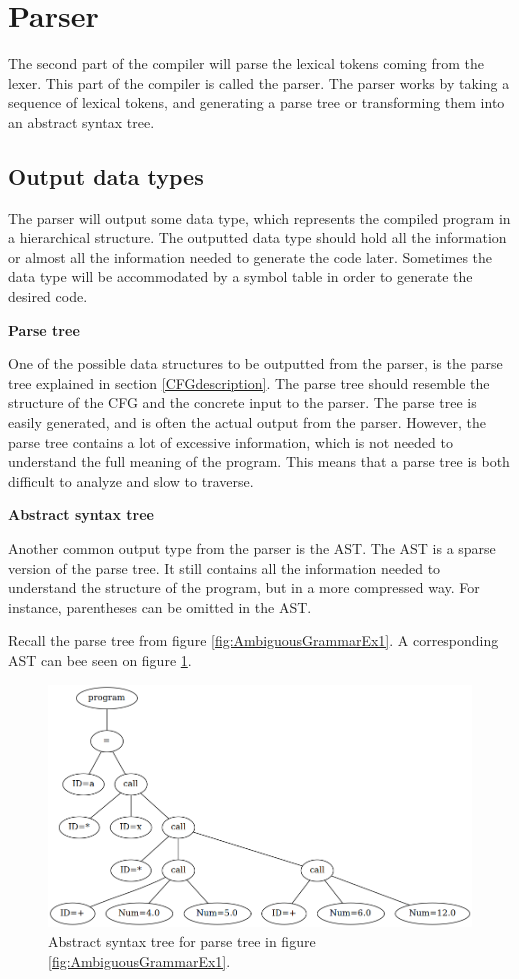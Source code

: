 \section{Parser}

The second part of the compiler will parse the lexical tokens coming from the lexer. 
This part of the compiler is called the parser. 
The parser works by taking a sequence of lexical tokens, and generating a parse tree or transforming them into an abstract syntax tree. 

\subsection{Output data types}

The parser will output some data type, which represents the compiled program in a hierarchical structure. 
The outputted data type should hold all the information or almost all the information needed to generate the code later. 
Sometimes the data type will be accommodated by a symbol table in order to generate the desired code.

\textbf{Parse tree}

One of the possible data structures to be outputted from the parser, is the parse tree explained in section \ref{CFGdescription}. 
The parse tree should resemble the structure of the CFG and the concrete input to the parser. 
The parse tree is easily generated, and is often the actual output from the parser. 
However, the parse tree contains a lot of excessive information, which is not needed to understand the full meaning of the program. 
This means that a parse tree is both difficult to analyze and slow to traverse. 

\textbf{Abstract syntax tree}

Another common output type from the parser is the AST.
The AST is a sparse version of the parse tree. 
It still contains all the information needed to understand the structure of the program, but in a more compressed way. 
For instance, parentheses can be omitted in the AST.

Recall the parse tree from figure \ref{fig:AmbiguousGrammarEx1}. 
A corresponding AST can bee seen on figure \ref{fig:ast}.

\begin{figure}[H]
	\centering
	\includegraphics[width=\textwidth*5/6]{3.Theory/images/ast.png}
	\caption{
		Abstract syntax tree for parse tree in figure \ref{fig:AmbiguousGrammarEx1}.
	}
	\label{fig:ast}
\end{figure}

